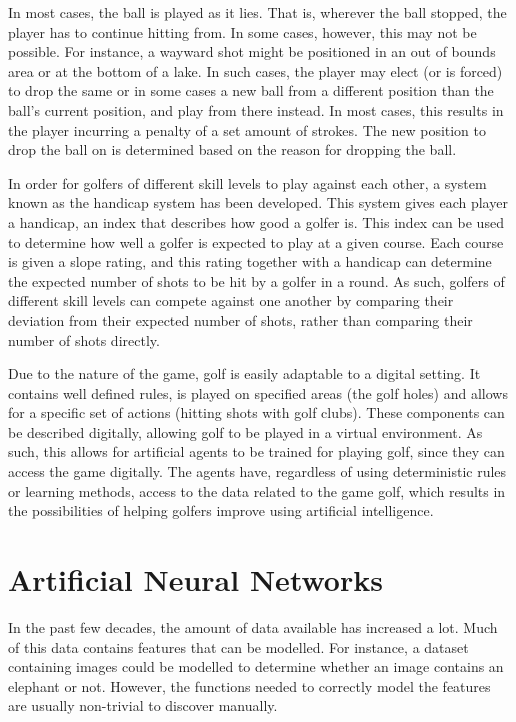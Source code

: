 \documentclass{kththesis}
\begin{document}
In most cases, the ball is played as it lies. That is, wherever the ball stopped, the player has to continue hitting from. In some cases, however, this may not be possible. For instance, a wayward shot might be positioned in an out of bounds area or at the bottom of a lake. In such cases, the player may elect (or is forced) to drop the same or in some cases a new ball from a different position than the ball's current position, and play from there instead. In most cases, this results in the player incurring a penalty of a set amount of strokes. The new position to drop the ball on is determined based on the reason for dropping the ball. 

In order for golfers of different skill levels to play against each other, a system known as the handicap system has been developed. This system gives each player a handicap, an index that describes how good a golfer is. This index can be used to determine how well a golfer is expected to play at a given course. Each course is given a slope rating, and this rating together with a handicap can determine the expected number of shots to be hit by a golfer in a round. As such, golfers of different skill levels can compete against one another by comparing their deviation from their expected number of shots, rather than comparing their number of shots directly.

Due to the nature of the game, golf is easily adaptable to a digital setting. It contains well defined rules, is played on specified areas (the golf holes) and allows for a specific set of actions (hitting shots with golf clubs). These components can be described digitally, allowing golf to be played in a virtual environment. As such, this allows for artificial agents to be trained for playing golf, since they can access the game digitally. The agents have, regardless of using deterministic rules or learning methods, access to the data related to the game golf, which results in the possibilities of helping golfers improve using artificial intelligence.

\section{Artificial Neural Networks}
\label{sec:neuralnetworks}
In the past few decades, the amount of data available has increased a lot. Much of this data contains features that can be modelled. For instance, a dataset containing images could be modelled to determine whether an image contains an elephant or not. However, the functions needed to correctly model the features are usually non-trivial to discover manually.
\end{document}
